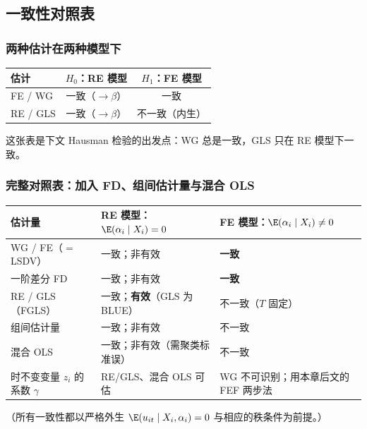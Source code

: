 \subsection{一致性对照表}

\subsubsection{两种估计在两种模型下}

\begin{center}\begin{minipage}{\linewidth}\centering
{}
\begin{tabularx}{0.8\linewidth}{lCC}
\toprule
估计 & $H_0$：RE 模型 & $H_1$：FE 模型\\
\midrule
FE / WG & 一致（$\to\beta$） & 一致\\
RE / GLS & 一致（$\to\beta$） & 不一致（内生）\\
\bottomrule
\end{tabularx}
\end{minipage}\end{center}
这张表是下文 Hausman 检验的出发点：WG 总是一致，GLS 只在 RE 模型下一致。

\subsubsection{完整对照表：加入 FD、组间估计量与混合 OLS \tagext}

\begin{center}\begin{minipage}{\linewidth}\centering
{}
\small
\begin{tabularx}{\linewidth}{>{\raggedright\arraybackslash}p{3.1cm}LL}
\toprule
估计量 & RE 模型：$\E(\alpha_i\mid X_i)=0$ & FE 模型：$\E(\alpha_i\mid X_i)\neq0$\\
\midrule
WG / FE（$=$ LSDV） & 一致；非有效 & \textbf{一致}\\
一阶差分 FD & 一致；非有效 & \textbf{一致}\\
RE / GLS（FGLS） & 一致；\textbf{有效}（GLS 为 BLUE） & 不一致（$T$ 固定）\\
组间估计量 & 一致；非有效 & 不一致\\
混合 OLS & 一致；非有效（需聚类标准误） & 不一致\\
\midrule
时不变变量 $z_i$ 的系数 $\gamma$ & RE/GLS、混合 OLS 可估 & WG 不可识别；用本章后文的 FEF 两步法\\
\bottomrule
\end{tabularx}
\end{minipage}\end{center}
（所有一致性都以严格外生 $\E(u_{it}\mid X_i,\alpha_i)=0$ 与相应的秩条件为前提。）

